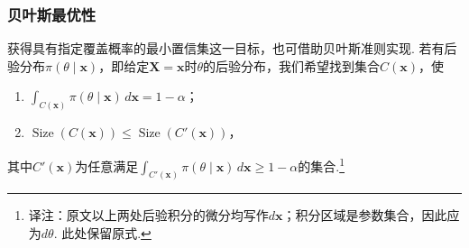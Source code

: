 \subsubsection{贝叶斯最优性}\label{sec:9.3.3}
获得具有指定覆盖概率的最小置信集这一目标，也可借助贝叶斯准则实现. 若有后验分布$\pi(\theta\mid\boldsymbol x)$，即给定$\boldsymbol X=\boldsymbol x$时$\theta$的后验分布，我们希望找到集合$C(\boldsymbol x)$，使
\begin{enumerate}[label=\roman*.]
\item $\displaystyle\int_{C(\boldsymbol x)}\pi(\theta\mid\boldsymbol x)\,d\boldsymbol x=1-\alpha$；
\item $\operatorname{Size}(C(\boldsymbol x))\le\operatorname{Size}(C'(\boldsymbol x))$，
\end{enumerate}
其中$C'(\boldsymbol x)$为任意满足$\int_{C'(\boldsymbol x)}\pi(\theta\mid\boldsymbol x)\,d\boldsymbol x\ge1-\alpha$的集合.\footnote{译注：原文以上两处后验积分的微分均写作$d\boldsymbol x$；积分区域是参数集合，因此应为$d\theta$. 此处保留原式.}

